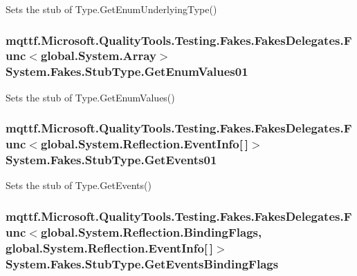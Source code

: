 Sets the stub of Type.\-Get\-Enum\-Underlying\-Type()

\hypertarget{class_system_1_1_fakes_1_1_stub_type_abbf271b06a3e60cccf65017d9854d742}{
\subsubsection[{Get\-Enum\-Values01}]{\setlength{\rightskip}{0pt plus 5cm}mqttf.\-Microsoft.\-Quality\-Tools.\-Testing.\-Fakes.\-Fakes\-Delegates.\-Func$<$global.\-System.\-Array$>$ System.\-Fakes.\-Stub\-Type.\-Get\-Enum\-Values01}}\label{class_system_1_1_fakes_1_1_stub_type_abbf271b06a3e60cccf65017d9854d742}


Sets the stub of Type.\-Get\-Enum\-Values()

\hypertarget{class_system_1_1_fakes_1_1_stub_type_a8365351e25d02c41965b5b74b3379337}{
\subsubsection[{Get\-Events01}]{\setlength{\rightskip}{0pt plus 5cm}mqttf.\-Microsoft.\-Quality\-Tools.\-Testing.\-Fakes.\-Fakes\-Delegates.\-Func$<$global.\-System.\-Reflection.\-Event\-Info\mbox{[}$\,$\mbox{]}$>$ System.\-Fakes.\-Stub\-Type.\-Get\-Events01}}\label{class_system_1_1_fakes_1_1_stub_type_a8365351e25d02c41965b5b74b3379337}


Sets the stub of Type.\-Get\-Events()

\hypertarget{class_system_1_1_fakes_1_1_stub_type_a954cca36adf0051e5c6c6778aef93cd3}{
\subsubsection[{Get\-Events\-Binding\-Flags}]{\setlength{\rightskip}{0pt plus 5cm}mqttf.\-Microsoft.\-Quality\-Tools.\-Testing.\-Fakes.\-Fakes\-Delegates.\-Func$<$global.\-System.\-Reflection.\-Binding\-Flags, global.\-System.\-Reflection.\-Event\-Info\mbox{[}$\,$\mbox{]}$>$ System.\-Fakes.\-Stub\-Type.\-Get\-Events\-Binding\-Flags}}\label{class_system_1_1_fakes_1_1_stub_type_a954cca36adf0051e5c6c6778aef93cd3}


